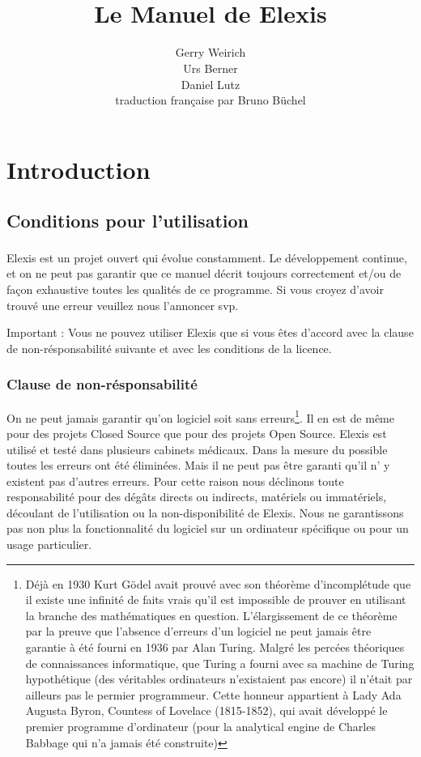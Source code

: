 \documentclass[paper=a4,BCOR8.25mm,twoside]{scrbook}
\author{Gerry Weirich\\Urs Berner\\Daniel Lutz\\traduction française par Bruno Büchel}
\title{Le Manuel de Elexis\textsuperscript{\textregistered}}
\begin{document}
\maketitle

\tableofcontents

\part{Introduction}
\chapter{Conditions pour l'utilisation}
Elexis\textsuperscript{\textregistered} est un projet ouvert qui évolue constamment. Le développement continue, et on ne peut pas garantir que ce manuel décrit toujours correctement et/ou de façon exhaustive toutes les qualités de ce programme. Si vous croyez d'avoir trouvé une erreur veuillez nous l'annoncer svp.

Important : Vous ne pouvez utiliser Elexis que si vous êtes d'accord avec la clause de non-résponsabilité suivante et avec les conditions de la licence.


\section{Clause de non-résponsabilité}
On ne peut jamais garantir qu'on logiciel soit sans erreurs\footnote{Déjà en 1930 Kurt Gödel avait prouvé avec son théorème d'incomplétude que il existe une infinité de faits vrais qu'il est impossible de prouver en utilisant la branche des mathématiques en question. L'élargissement de ce théorème par la preuve que l'absence d'erreurs d'un logiciel ne peut jamais être garantie à été fourni en 1936 par Alan Turing. Malgré les percées théoriques de connaissances informatique, que Turing a fourni avec sa machine de Turing hypothétique (des véritables ordinateurs n'existaient pas encore) il n'était par ailleurs pas le permier programmeur. Cette honneur appartient à Lady Ada Augusta Byron, Countess of Lovelace (1815-1852), qui avait développé le premier programme d'ordinateur (pour la analytical engine de Charles Babbage qui n'a jamais été construite)}. Il en est de même pour des projets Closed Source que pour des projets Open Source. Elexis est utilisé et testé dans plusieurs cabinets médicaux. Dans la mesure du 
possible toutes les erreurs ont été éliminées. Mais il ne peut pas être garanti qu'il n' y existent pas d'autres erreurs.
Pour cette raison nous déclinons toute responsabilité pour des dégâts directs ou indirects, matériels ou immatériels, découlant de l'utilisation ou la non-disponibilité de Elexis. Nous ne garantissons pas non plus la fonctionnalité du logiciel sur un ordinateur spécifique ou pour un usage particulier.
\end{document}
